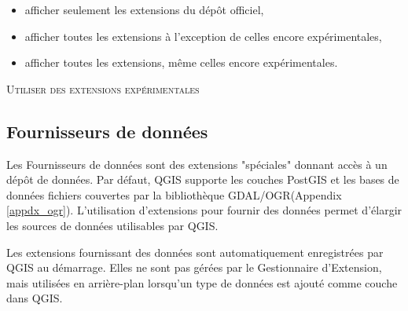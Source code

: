 \begin{itemize}
\item afficher seulement les extensions du dépôt officiel,
\item afficher toutes les extensions à l'exception de celles encore expérimentales,
\item afficher toutes les extensions, même celles encore expérimentales.
\end{itemize}

\begin{Astuce}
 \caption{\textsc{Utiliser des extensions expérimentales}}

\end{Astuce}


\subsection{Fournisseurs de données}


Les Fournisseurs de données sont des extensions "spéciales" donnant accès à un dépôt de données.
Par défaut, QGIS supporte les couches PostGIS et les bases de données fichiers couvertes par la bibliothèque GDAL/OGR(Appendix \ref{appdx_ogr}).
L'utilisation d'extensions pour fournir des données permet d'élargir les sources de données utilisables par QGIS.

Les extensions fournissant des données sont automatiquement enregistrées par QGIS au démarrage.
Elles ne sont pas gérées par le Gestionnaire d'Extension, mais utilisées en arrière-plan lorsqu'un type de données est ajouté comme couche dans QGIS.
